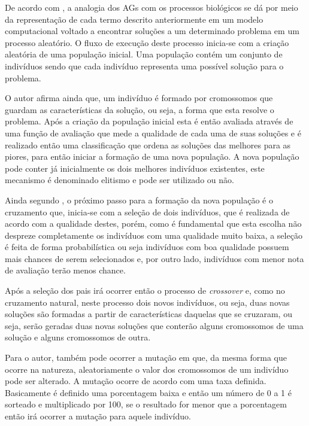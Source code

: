 \par De acordo com , a analogia dos AGs com
os processos biológicos se dá por meio da representação de cada termo descrito
anteriormente em um modelo computacional voltado a encontrar soluções a um
determinado problema em um processo aleatório. O fluxo de execução deste processo
inicia-se com a criação aleatória de uma população inicial. Uma população contém
um conjunto de indivíduos sendo que cada indivíduo  representa uma possível solução
para o problema.

\par O autor afirma ainda que, um indivíduo é formado por cromossomos que
guardam as características da solução, ou seja, a forma que esta resolve o
problema.
Após a criação da população inicial esta é então avaliada através de uma
função de avaliação que mede a qualidade de cada uma de suas soluções e é
realizado então uma classificação que ordena as soluções das melhores para as
piores, para então iniciar a formação de uma nova população. A nova população
pode conter já inicialmente os dois melhores indivíduos existentes, este mecanismo é
denominado elitismo e pode ser utilizado ou não.

\par Ainda segundo , o próximo passo
para a formação da nova população é o cruzamento que, inicia-se com a seleção de
dois indivíduos, que é realizada de acordo com a qualidade destes, porém,
como é fundamental que esta escolha não despreze completamente os indivíduos com uma
qualidade muito baixa, a seleção é feita de forma probabilística ou seja
indivíduos com boa qualidade possuem mais chances de serem selecionados e, por outro lado,
indivíduos com menor nota de avaliação terão menos chance. 

\par Após a seleção dos pais irá ocorrer então o processo de \textit{crossover}
e, como no cruzamento natural, neste processo dois novos indivíduos, ou seja, duas
novas soluções são formadas a partir de características daquelas que se
cruzaram, ou seja, serão geradas duas novas soluções que conterão alguns cromossomos
de uma solução e alguns cromossomos de outra.

\par Para o autor, também pode ocorrer a mutação em
que, da mesma forma que ocorre na natureza, aleatoriamente o valor dos
cromossomos de um indivíduo pode ser alterado. A mutação ocorre de acordo com
uma taxa definida. Basicamente é definido uma porcentagem baixa e então um
número de 0 a 1 é sorteado e multiplicado por 100, se o resultado for menor que
a porcentagem então irá ocorrer a mutação para aquele indivíduo.

